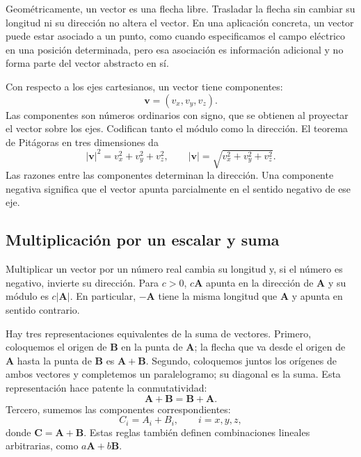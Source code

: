 Geométricamente, un vector es una flecha libre. Trasladar la flecha sin cambiar
su longitud ni su dirección no altera el vector. En una aplicación concreta, un
vector puede estar asociado a un punto, como cuando especificamos el campo
eléctrico en una posición determinada, pero esa asociación es información
adicional y no forma parte del vector abstracto en sí.

Con respecto a los ejes cartesianos, un vector tiene componentes:
\begin{equation}
  \mathbf v=(v_x,v_y,v_z).
\end{equation}
Las componentes son números ordinarios con signo, que se obtienen al proyectar el
vector sobre los ejes. Codifican tanto el módulo como la dirección. El teorema de
Pitágoras en tres dimensiones da
\begin{equation}
  \lvert\mathbf v\rvert^2
  =v_x^2+v_y^2+v_z^2,
  \qquad
  \lvert\mathbf v\rvert
  =\sqrt{v_x^2+v_y^2+v_z^2}.
  \label{eq:vector-magnitude}
\end{equation}
Las razones entre las componentes determinan la dirección. Una componente
negativa significa que el vector apunta parcialmente en el sentido negativo de
ese eje.

\subsection{Multiplicación por un escalar y suma}

Multiplicar un vector por un número real cambia su longitud y, si el número es
negativo, invierte su dirección. Para \(c>0\), \(c\mathbf A\) apunta en la dirección
de \(\mathbf A\) y su módulo es
\(c\lvert\mathbf A\rvert\). En particular, \(-\mathbf A\) tiene la misma
longitud que \(\mathbf A\) y apunta en sentido contrario.

Hay tres representaciones equivalentes de la suma de vectores. Primero,
coloquemos el origen de \(\mathbf B\) en la punta de \(\mathbf A\); la flecha que va
desde el origen de \(\mathbf A\) hasta la punta de \(\mathbf B\) es
\(\mathbf A+\mathbf B\).
Segundo, coloquemos juntos los orígenes de ambos vectores y completemos un
paralelogramo; su diagonal es la suma. Esta representación hace patente la
conmutatividad:
\begin{equation}
  \mathbf A+\mathbf B=\mathbf B+\mathbf A.
\end{equation}
Tercero, sumemos las componentes correspondientes:
\begin{equation}
  C_i=A_i+B_i,
  \qquad i=x,y,z,
  \label{eq:component-addition}
\end{equation}
donde \(\mathbf C=\mathbf A+\mathbf B\). Estas reglas también definen combinaciones
lineales arbitrarias, como \(a\mathbf A+b\mathbf B\).

